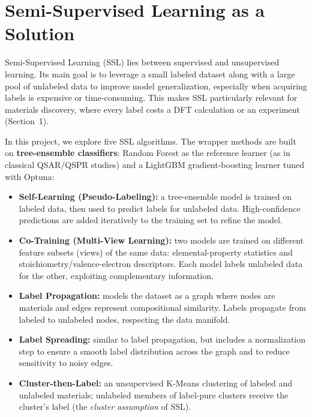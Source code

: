 \clearpage
\section{Semi-Supervised Learning as a Solution}

Semi-Supervised Learning (SSL) lies between supervised and unsupervised learning. Its main goal
is to leverage a small labeled dataset along with a large pool of unlabeled data to improve
model generalization, especially when acquiring labels is expensive or time-consuming. This
makes SSL particularly relevant for materials discovery, where every label costs a DFT
calculation or an experiment (Section~1).

In this project, we explore five SSL algorithms. The wrapper methods are built on
\textbf{tree-ensemble classifiers}: Random Forest as the reference learner (as in classical
QSAR/QSPR studies) and a LightGBM gradient-boosting learner tuned with Optuna:

\begin{itemize}
  \item \textbf{Self-Learning (Pseudo-Labeling):} a tree-ensemble model is trained on labeled
  data, then used to predict labels for unlabeled data. High-confidence predictions are added
  iteratively to the training set to refine the model.
  \item \textbf{Co-Training (Multi-View Learning):} two models are trained on different
  feature subsets (views) of the same data: elemental-property statistics and
  stoichiometry/valence-electron descriptors. Each model labels unlabeled data for the other,
  exploiting complementary information.
  \item \textbf{Label Propagation:} models the dataset as a graph where nodes are materials and
  edges represent compositional similarity. Labels propagate from labeled to unlabeled nodes,
  respecting the data manifold.
  \item \textbf{Label Spreading:} similar to label propagation, but includes a normalization
  step to ensure a smooth label distribution across the graph and to reduce sensitivity to
  noisy edges.
  \item \textbf{Cluster-then-Label:} an unsupervised K-Means clustering of labeled and
  unlabeled materials; unlabeled members of label-pure clusters receive the cluster's label
  (the \emph{cluster assumption} of SSL).
\end{itemize}

